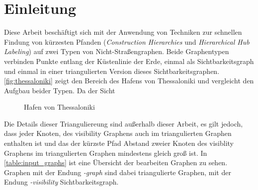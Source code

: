 \chapter{Einleitung}

Diese Arbeit beschäftigt sich mit der Anwendung von Techniken zur schnellen Findung von kürzesten Pfanden (\emph{Construction Hierarchies} und \emph{Hierarchical Hub Labeling}) auf zwei Typen von Nicht-Straßengraphen.
Beide Graphentypen verbinden Punkte entlang der Küstenlinie der Erde, einmal als Sichtbarkeitsgraph und einmal in einer triangulierten Version dieses Sichtbarkeitsgraphen.
\autoref{fig:thessaloniki} zeigt den Bereich des Hafens von Thessaloniki und vergleicht den Aufgbau beider Typen.
Da der Sicht

\begin{figure}[h]%
    \centering
    \caption{Hafen von Thessaloniki}%
    \label{fig:thessaloniki}%
\end{figure}


Die Details dieser Trianguliereung sind außerhalb dieser Arbeit, es gilt jedoch, dass jeder Knoten, des visibility Graphens auch im triangulierten Graphen enthalten ist und das der kürzste Pfad Abstand zweier Knoten des visiblity Graphens im triangulierten Graphen mindestens gleich groß ist.
In \autoref{table:input_graphs} ist eine Übersicht der bearbeiten Graphen zu sehen. Graphen mit der Endung \emph{-graph} sind dabei triangulierte Graphen, mit der Endung \emph{-visibility} Sichtbarkeitsgraph.

